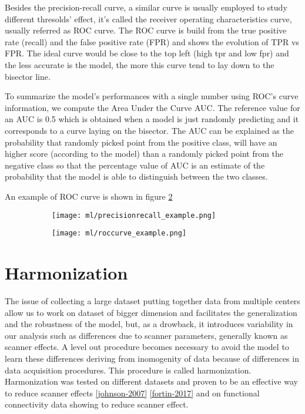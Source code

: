 \documentclass[a4paper,11pt]{article}
\begin{document}
Besides the precision-recall curve, a similar curve is usually employed to study different thresolds' effect, it's called the receiver operating characteristics curve, usually referred as ROC curve.
The ROC curve is build from the true positive rate (recall) and the false positive rate (FPR) and shows the evolution of TPR vs FPR.
The ideal curve would be close to the top left (high tpr and low fpr) and the less accurate is the model, the more this curve tend to lay down to the bisector line.

To summarize the model's performances with a single number using ROC's curve information, we compute the Area Under the Curve AUC.
The reference value for an AUC is 0.5 which is obtained when a model is just randomly predicting and it corresponds to a curve laying on the bisector.
The AUC can be explained as the probability that randomly picked point from the positive class, will have an higher score (according to the model) than a randomly picked point from the negative class so that the percentage value of AUC is an estimate of the probability that the model is able to distinguish between the two classes.

An example of ROC curve is shown in figure \ref{fig:roccurve}


\begin{figure}
\centering
\begin{subfigure}{0.4\textwidth}
\texttt{[image: ml/precisionrecall\_example.png]}
\caption{}
\label{fig:precisionrecall}
\end{subfigure}
\begin{subfigure}{0.4\textwidth}
\texttt{[image: ml/roccurve\_example.png]}
\caption{}
\label{fig:roccurve}
\end{subfigure}
\caption{}
\label{}
\end{figure}




\section{Harmonization}
The issue of collecting a large dataset putting together data from multiple centers allow us to work on dataset of bigger dimension and facilitates the generalization and the robustness of the model, but, as a drowback, it introduces variability in our analysis such as differences due to scanner parameters, generally known as scanner effects.
A level out procedure becomes necessary to avoid the model to learn these differences deriving from inomogenity of data because of differences in data acquisition procedures.
This procedure is called harmonization.
Harmonization was tested on different datasets and proven to be an effective way to reduce scanner effects \ref{johnson-2007} \ref{fortin-2017} and on functional connectivity data showing to reduce scanner effect.
\end{document}
